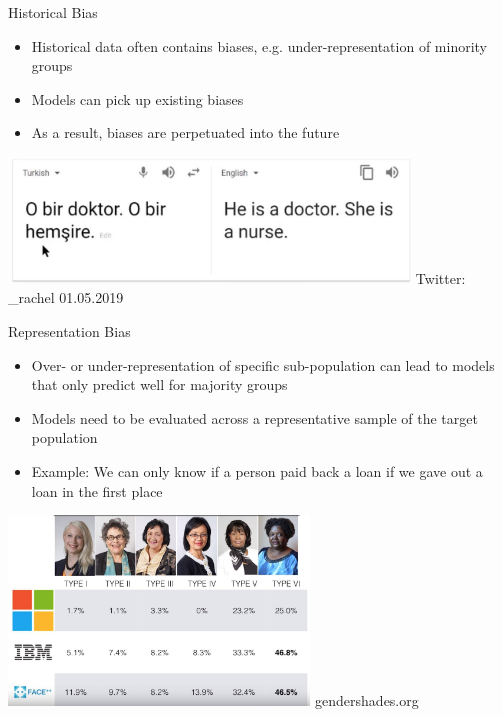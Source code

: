 \documentclass[11pt,compress,t,notes=noshow, xcolor=table]{beamer}
\begin{document}
\begin{vbframe}{Historical Bias}
    \begin{itemize}
        \item Historical data often contains biases, e.g. under-representation of minority groups
        \item Models can pick up existing biases
        \item As a result, biases are perpetuated into the future
    \end{itemize}
    \vspace{1cm}
    
    \begin{center}
        \includegraphics[width=0.8\textwidth]{figures/historical_bias.png}
        \tiny{Twitter: \@math\_rachel 01.05.2019}
    \end{center}
\end{vbframe}

\begin{vbframe}{Representation Bias}
    \vspace{-0.25cm}
    \begin{itemize}
        \item Over- or under-representation of specific sub-population can lead to models that only predict well for majority groups
        \item Models need to be evaluated across a representative sample of the target population
        \item Example: We can only know if a person paid back a loan if we gave out a loan in the first place
    \end{itemize}
    
    \begin{center}
        \includegraphics[width=0.6\textwidth]{figures/gendershades.jpeg}
        \tiny{gendershades.org}
    \end{center}
\end{vbframe}
\end{document}
